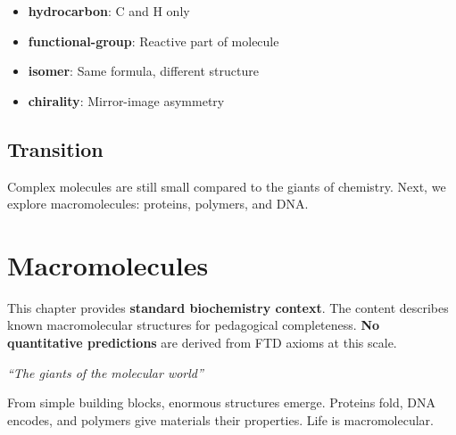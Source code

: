 \documentclass[
  11pt,
  letterpaper,
  twoside,
  openright]{book}
\providecommand{\tightlist}{%
  \setlength{\itemsep}{0pt}\setlength{\parskip}{0pt}}
\begin{document}
\begin{itemize}
\tightlist
\item
  \textbf{hydrocarbon}: C and H only
\item
  \textbf{functional-group}: Reactive part of molecule
\item
  \textbf{isomer}: Same formula, different structure
\item
  \textbf{chirality}: Mirror-image asymmetry
\end{itemize}

\section{Transition}\label{transition-6}

Complex molecules are still small compared to the giants of chemistry.
Next, we explore macromolecules: proteins, polymers, and DNA.

\chapter{Macromolecules}\label{sec-macromolecules}

\begin{tcolorbox}[enhanced jigsaw, coltitle=black, colbacktitle=quarto-callout-warning-color!10!white, toprule=.15mm, colframe=quarto-callout-warning-color-frame, arc=.35mm, opacityback=0, bottomtitle=1mm, toptitle=1mm, breakable, colback=white, titlerule=0mm, opacitybacktitle=0.6, title=\textcolor{quarto-callout-warning-color}{\faExclamationTriangle}\hspace{0.5em}{Pedagogical Context {[}NOT DERIVED FROM FTD{]}}, rightrule=.15mm, bottomrule=.15mm, leftrule=.75mm, left=2mm]

This chapter provides \textbf{standard biochemistry context}. The
content describes known macromolecular structures for pedagogical
completeness. \textbf{No quantitative predictions} are derived from FTD
axioms at this scale.

\end{tcolorbox}

\emph{``The giants of the molecular world''}

\begin{tcolorbox}[enhanced jigsaw, coltitle=black, colbacktitle=quarto-callout-note-color!10!white, toprule=.15mm, colframe=quarto-callout-note-color-frame, arc=.35mm, opacityback=0, bottomtitle=1mm, toptitle=1mm, breakable, colback=white, titlerule=0mm, opacitybacktitle=0.6, title=\textcolor{quarto-callout-note-color}{\faInfo}\hspace{0.5em}{Key Revelation}, rightrule=.15mm, bottomrule=.15mm, leftrule=.75mm, left=2mm]

From simple building blocks, enormous structures emerge. Proteins fold,
DNA encodes, and polymers give materials their properties. Life is
macromolecular.

\end{tcolorbox}
\end{document}
